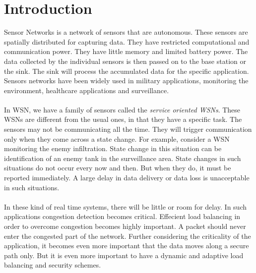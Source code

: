 \documentclass[journal]{IEEEtran}
\begin{document}
\section{Introduction}
% 
% 
% 
% 
 Sensor Networks is a network of sensors that are autonomous. These sensors are spatially distributed for capturing data. They have restricted computational and communication power. They have little memory and limited battery power. The data collected by the individual sensors is then passed on to the base station or the sink. The sink will process the accumulated data for the specific application. Sensors networks have been widely used in military applications, monitoring the environment, healthcare applications and surveillance.\\ \\
\indent In WSN, we have a family of sensors called the \textit{service oriented WSNs}. These WSNs are different from the usual ones, in that they have a specific task. The sensors may not be communicating all the time. They will trigger communication only when they come across a state change. For example, consider a WSN monitoring the enemy infiltration. State change in this situation can be identification of an enemy tank in the surveillance area. State changes in such situations do not occur every now and then. But when they do, it must be reported immediately. A large delay in data delivery or data loss is unacceptable in such situations. \\ \\
\indent In these kind of real time systems, there will be little or room for delay. In such applications congestion detection becomes critical. Effecient load balancing in order to overcome congestion becomes highly important. A packet should  never enter the congested part of the network. Further considering the criticality of the application, it becomes even more important that the data moves along a secure path only. But it is even more important to have a dynamic and adaptive load balancing and security schemes. \\ \\
\end{document}
